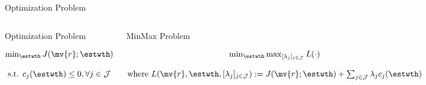 \documentclass[8pt, aspectratio=169]{beamer}
\begin{document}
\begin{frame}{\insertsubsectionhead}{Optimization Problem}

  \begin{columns}

      
      \centering
      \begin{minipage}{0.9\textwidth}%
        \begin{block}{Optimization Problem}%


          \begin{equation}
            \begin{matrix}
              \min_{\estwth} J(\mv{r};\estwth)
              \\\ \\
              \text{s.t. } c_{j}(\estwth) 
              \le 
              0
              ,
              \forall j\in\mathcal{J}
            \end{matrix}
          \end{equation}

        \end{block}
      \end{minipage}


      \centering
      \begin{minipage}{0.9\textwidth}%
        \begin{block}{MinMax Problem}%
          

          \begin{equation}
            \begin{matrix}
              \min_{\estwth}\max_{[\lambda_j]_{j\in\mathcal{J}}} L(\cdot)
              \\\ \\
              \text{where }
              L(\mv{r},\estwth,[\lambda_j]_{j\in\mathcal{J}})
              :=
              J(\mv{r};\estwth)
              +
              \sum_{j\in\mathcal{J}} \lambda_j c_j(\estwth)
            \end{matrix}
          \end{equation}

        \end{block}
      \end{minipage}

  \end{columns}

\end{frame}
\end{document}
